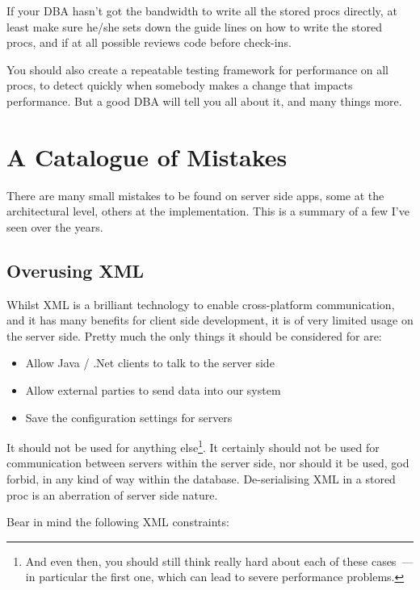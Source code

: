 \documentclass{memoir}
\begin{document}
If your DBA hasn't got the bandwidth to write all the stored procs
directly, at least make sure he/she sets down the guide lines on how
to write the stored procs, and if at all possible reviews code before
check-ins.

You should also create a repeatable testing framework for performance
on all procs, to detect quickly when somebody makes a change that
impacts performance. But a good DBA will tell you all about it, and
many things more.

\section{A Catalogue of Mistakes}

There are many small mistakes to be found on server side apps, some at
the architectural level, others at the implementation. This is a
summary of a few I've seen over the years.

\subsection{Overusing XML}

Whilst XML is a brilliant technology to enable cross-platform
communication, and it has many benefits for client side development,
it is of very limited usage on the server side. Pretty much the only
things it should be considered for are:

\begin{itemize}
\item Allow Java / .Net clients to talk to the server side
\item Allow external parties to send data into our system
\item Save the configuration settings for servers
\end{itemize}


It should not be used for anything else\footnote{And even then, you
  should still think really hard about each of these cases~--- in
  particular the first one, which can lead to severe performance
  problems.}. It certainly should not be used for communication
between servers within the server side, nor should it be used, god
forbid, in any kind of way within the database. De-serialising XML in
a stored proc is an aberration of server side nature.

Bear in mind the following XML constraints:
\end{document}
